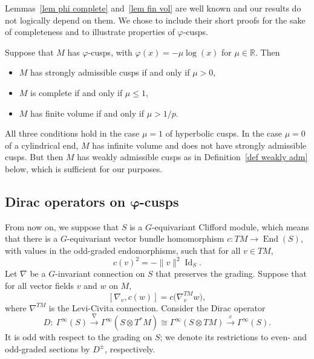 \documentclass[10pt,a4paper]{amsart}
\numberwithin{equation}{section}
\DeclareMathOperator{\Id}{Id}
\DeclareMathOperator{\End}{End}
\newcommand{\R}{\mathbb{R}}
\begin{document}
Lemmas~\ref{lem phi complete} and~\ref{lem fin vol} are well known and our results do not logically depend on them. We chose to include their short proofs for the sake of completeness and to illustrate properties of $\varphi$-cusps.

\begin{Example}\label{ex mu log x}
Suppose that $M$ has {$\varphi$-cusps}, with $\varphi(x) = -\mu \log(x)$ for $\mu \in \R$. Then
\begin{itemize}\itemsep=0pt
\item
$M$ has strongly admissible {cusps} if and only if $\mu>0$,
\item $M$ is complete if and only if $\mu \leq 1$,
\item $M$ has finite volume if and only if $\mu > 1/p$.
\end{itemize}
All three conditions hold in the case $\mu = 1$ of hyperbolic cusps. In the case $\mu = 0$ of a cylindrical end, $M$ has infinite volume and does not have strongly admissible cusps. But then $M$ has weakly admissible cusps as in Definition~\ref{def weakly adm} below, which is sufficient for our purposes.
\end{Example}

\subsection[Dirac operators on varphi-cusps]{Dirac operators on $\boldsymbol{\varphi}$-cusps}

From now on, we suppose that $S$ is a $G$-equivariant Clifford module, which means that there is a $G$-equivariant vector bundle homomorphism $c\colon TM \to \End(S)$, with values in the odd-graded endomorphisms, such that for all $v \in TM$,
\[
c(v)^2 = -\|v\|^2 \Id_S.
\]
Let $\nabla$ be a $G$-invariant connection on $S$ that preserves the grading. Suppose that for all vector fields $v$ and $w$ on $M$,
\begin{equation} \label{eq Clifford conn}
[\nabla_v, c(w)] = c\big(\nabla^{TM}_v w\big),
\end{equation}
where $\nabla^{TM}$ is the Levi-Civita connection. Consider the Dirac operator
\begin{equation} \label{eq Dirac}
D\colon\ \Gamma^{\infty}(S) \xrightarrow{\nabla} \Gamma^{\infty}(S \otimes T^*M) \cong
 \Gamma^{\infty}(S \otimes TM) \xrightarrow{c} \Gamma^{\infty}(S).
\end{equation}
It is odd with respect to the grading on $S$; we denote its restrictions to even- and odd-graded sections by $D^{\pm}$, respectively.
\end{document}
